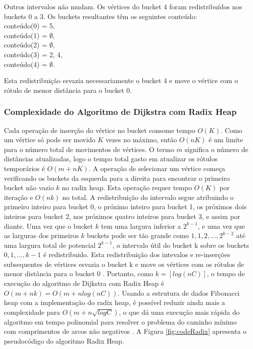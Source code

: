 Outros intervalos não mudam. Os vértices do bucket 4 foram redistribuídos nos buckets 0 a 3.
Os buckets resultantes têm os seguintes conteúdo:\\
conteúdo(0) = {5},\\
conteúdo(1) = $\emptyset$,\\
conteúdo(2) = $\emptyset$,\\
conteúdo(3) = {2, 4},\\
conteúdo(4) = $\emptyset$.

Esta redistribuição esvazia necessariamente o bucket 4 e move o vértice com o rótulo de menor distância para o bucket 0.

\subsubsection{Complexidade do Algoritmo de Dijkstra com Radix Heap}
Cada operação de inserção do vértice no bucket consome tempo $O(K)$.
Como um vértice só pode ser movido $K$ vezes no máximo, então $O(nK)$ é um limite para o número total de movimentos
de vértices.
O termo $m$ significa o número de distâncias atualizadas, logo o tempo total gasto em atualizar os rótulos temporários
é $O(m + nK)$.
A operação de selecionar um vértice começa verificando os buckets da esquerda para a direita para encontrar
o primeiro bucket não vazio $k$ no radix heap. Esta operação requer tempo $O(K)$ por iteração e $O(nk)$ no total.
A redistribuição do intervalo segue atribuindo o primeiro inteiro para bucket 0, o próximo inteiro para bucket 1,
os próximos dois inteiros para bucket 2, nos próximos quatro inteiros para bucket 3, e assim por diante.
Uma vez que o bucket $k$ tem uma largura inferior a $2^{k - 1}$, e uma vez que as larguras dos primeiros $k$ buckets
pode ser tão grande como $1, 1, 2, ..., 2^{k - 2}$ até uma largura total de potencial $2^{k - 1}$,
o intervalo útil do bucket k sobre os buckets $0, 1, ..., k - 1$ é redistribuido.
Esta redistribuição dos intevalos e re-inserções subsequentes de vértices esvazia o bucket k e move os vértices com
os rótulos de menor distância para o bucket 0 \cite{bookahuja}.
Portanto, como $k = [log(nC)]$, o tempo de execução do algoritmo de Dijkstra com Radix Heap é $O(m + nk) = O(m + n log(nC))$.
Usando a estrutura de dados Fibonacci heap com a implementação do radix heap, é possível reduzir ainda mais a complexidade
para $O(m + n\sqrt{logC})$, o que dá uma execução mais rápida do algoritmo em tempo polinomial para resolver
o problema do caminho mínimo com comprimentos de arcos não negativos \cite{ahuja}.
A Figura \ref{fig:codeRadix} apresenta o pseudocódigo do algoritmo Radix Heap.

